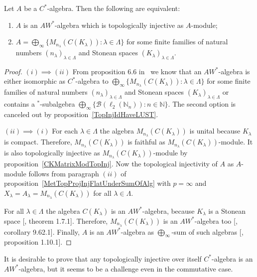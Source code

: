 \begin{theorem}\label{TopInjAWStarAlgCharac} Let $A$ be a $C^*$-algebra. Then
the following are equivalent:

\begin{enumerate}[label = (\roman*)]
    \item $A$ is an $AW^*$-algebra which is topologically injective 
    as $A$-module;

    \item $A
    =\bigoplus_\infty \{M_{n_\lambda}(C(K_\lambda)):\lambda\in\Lambda \}$
    for some finite families of natural 
    numbers ${(n_\lambda)}_{\lambda\in\Lambda}$ and Stonean 
    spaces ${(K_\lambda)}_{\lambda\in\Lambda}$.
\end{enumerate}
\end{theorem}
\begin{proof}$(i)\implies (ii)$ From proposition 6.6
in~\cite{SmithDecompPropCStarAlg} we know that an $AW^*$-algebra is either
isomorphic as $C^*$-algebra 
to  $\bigoplus_\infty \{M_{n_\lambda}(C(K_\lambda)):\lambda\in\Lambda \}$ 
for some finite families of natural numbers ${(n_\lambda)}_{\lambda\in\Lambda}$ 
and Stonean spaces ${(K_\lambda)}_{\lambda\in\Lambda}$ or contains 
a ${}^*$-subalgebra 
$\bigoplus_\infty \{ \mathcal{B}(\ell_2(\mathbb{N}_n)):n\in\mathbb{N} \}$. The
second option is canceled out by proposition~\ref{TopInjIdHaveLUST}.

$(ii)\implies (i)$ For each $\lambda\in\Lambda$ the algebra
$M_{n_\lambda}(C(K_\lambda))$ is unital because $K_\lambda$ is compact.
Therefore, $M_{n_\lambda}(C(K_\lambda))$ is faithful as
$M_{n_\lambda}(C(K_\lambda))$-module. It is also topologically injective as
$M_{n_\lambda}(C(K_\lambda))$-module by proposition~\ref{CKMatrixModTopInj}.
Now the topological injectivity of $A$ as $A$-module follows from paragraph
$(ii)$ of proposition~\ref{MetTopProjInjFlatUnderSumOfAlg} with $p=\infty$ and
$X_\lambda=A_\lambda=M_{n_\lambda}(C(K_\lambda))$ for all $\lambda\in\Lambda$. 

For all $\lambda\in\Lambda$ the algebra $C(K_\lambda)$ is an $AW^*$-algebra,
because $K_\lambda$ is a Stonean space [\cite{BerbBaerStarRings}, theorem
1.7.1]. Therefore, $M_{n_\lambda}(C(K_\lambda))$ is an $AW^*$-algebra too
[\cite{BerbBaerStarRings}, corollary 9.62.1]. Finally, $A$ is an $AW^*$-algebra
as $\bigoplus_\infty$-sum of such algebras [\cite{BerbBaerStarRings},
proposition 1.10.1].
\end{proof}

It is desirable to prove that any topologically injective over itself
$C^*$-algebra is an $AW^*$-algebra, but it seems to be a challenge even in the
commutative case.

